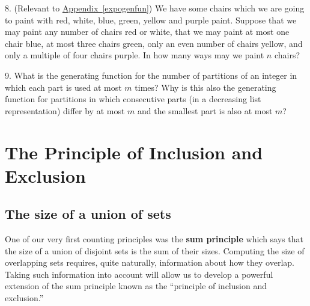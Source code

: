 \documentclass[10pt,]{book}
\newcommand{\terminology}[1]{\textbf{#1}}
\theoremstyle{plain}
\theoremstyle{definition}
\theoremstyle{definition}
\numberwithin{equation}{chapter}
\newcommand{\importantarrow}{\Rightarrow}
\begin{document}
\begin{exerciselist}
\par\smallskip
\item[8.]\marginsymbol[-1em]{\pdftooltip{$\importantarrow$}{especially interesting}} \hypertarget{exercise-44}{}(Relevant to \hyperref[expogenfun]{Appendix~\ref{expogenfun}}) We have some chairs which we are going to paint with red, white, blue, green, yellow and purple paint. Suppose that we may paint any number of chairs red or white, that we may paint at most one chair blue, at most three chairs green, only an even number of chairs yellow, and only a multiple of four chairs purple. In how many ways may we paint \(n\) chairs?%
\par\smallskip
\item[9.]\marginsymbol[-1em]{} \hypertarget{exercise-45}{}What is the generating function for the number of partitions of an integer in which each part is used at most \(m\) times? Why is this also the generating function for partitions in which consecutive parts (in a decreasing list representation) differ by at most \(m\) and the smallest part is also at most \(m\)?%
\par\smallskip
\end{exerciselist}
\typeout{************************************************}
\typeout{************************************************}
\chapter[{The Principle of Inclusion and Exclusion}]{The Principle of Inclusion and Exclusion}\label{ch_inclexcl}
\typeout{************************************************}
\typeout{************************************************}
\section[{The size of a union of sets}]{The size of a union of sets}\label{sec_inclexcl-sizeunion}
One of our very first counting principles was the \terminology{sum principle} which says that the size of a union of disjoint sets is the sum of their sizes. Computing the size of overlapping sets requires, quite naturally, information about how they overlap. Taking such information into account will allow us to develop a powerful extension of the sum principle known as the ``principle of inclusion and exclusion.''%
\typeout{************************************************}
\typeout{************************************************}
\end{document}
